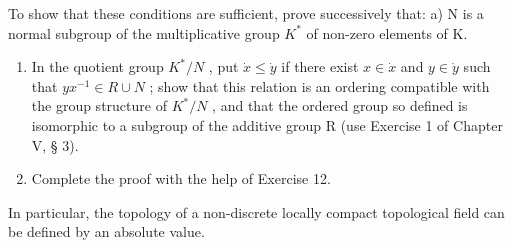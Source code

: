 To show that these conditions are sufficient, prove successively that: a) N is a normal subgroup of the multiplicative group \(K^{*}\) of non-zero elements of K.

\begin{enumerate}
\def\labelenumi{\alph{enumi})}
\setcounter{enumi}{1}
\item
  In the quotient group \(K^{*}/N\) , put \(\dot{x} \leqslant \dot{y}\) if there exist \(x \in \dot{x}\) and \(y \in \dot{y}\) such that \(yx^{-1} \in R \cup N\) ; show that this relation is an ordering compatible with the group structure of \(K^{*}/N\) , and that the ordered group so defined is isomorphic to a subgroup of the additive group R (use Exercise 1 of Chapter V, § 3).
\item
  Complete the proof with the help of Exercise 12.
\end{enumerate}

In particular, the topology of a non-discrete locally compact topological field can be defined by an absolute value.

